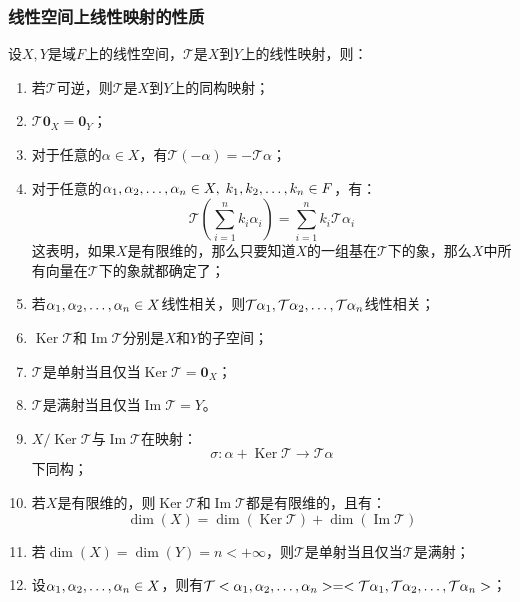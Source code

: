 \subsubsection{线性空间上线性映射的性质}
\begin{property}\label{prop:LinearMapping}
	设$X,Y$是域$F$上的线性空间，$\mathcal{T}$是$X$到$Y$上的线性映射，则：
	\begin{enumerate}
		\item 若$\mathcal{T}$可逆，则$\mathcal{T}$是$X$到$Y$上的同构映射；
		\item $\mathcal{T}\mathbf{0}_X=\mathbf{0}_Y$；
		\item 对于任意的$\alpha\in X$，有$\mathcal{T}(-\alpha)=-\mathcal{T}\alpha$；
		\item 对于任意的$\alpha_1, \alpha_2, \dots, \alpha_{n}\in X,\;k_1, k_2, \dots, k_{n}\in F$，有：
		\begin{equation*}
			\mathcal{T}\left(\sum_{i=1}^{n}k_i\alpha_i\right)=\sum_{i=1}^{n}k_i\mathcal{T}\alpha_i
		\end{equation*}
		这表明，如果$X$是有限维的，那么只要知道$X$的一组基在$\mathcal{T}$下的象，那么$X$中所有向量在$\mathcal{T}$下的象就都确定了；
		\item 若$\alpha_1, \alpha_2, \dots, \alpha_{n}\in X$线性相关，则$\mathcal{T}\alpha_1, \mathcal{T}\alpha_2, \dots, \mathcal{T}\alpha_{n}$线性相关；
		\item $\operatorname{Ker}\mathcal{T}$和$\operatorname{Im}\mathcal{T}$分别是$X$和$Y$的子空间；
		\item $\mathcal{T}$是单射当且仅当$\operatorname{Ker}\mathcal{T}=\mathbf{0}_X$；
		\item $\mathcal{T}$是满射当且仅当$\operatorname{Im}\mathcal{T}=Y$。
		\item $X/\operatorname{Ker}\mathcal{T}$与$\operatorname{Im}\mathcal{T}$在映射：
		\begin{equation*}
			\sigma:\alpha+\operatorname{Ker}\mathcal{T}\longrightarrow\mathcal{T}\alpha
		\end{equation*}
		下同构；
		\item 若$X$是有限维的，则$\operatorname{Ker}\mathcal{T}$和$\operatorname{Im}\mathcal{T}$都是有限维的，且有：
		\begin{equation*}
			\dim(X)=\dim(\operatorname{Ker}\mathcal{T})+\dim(\operatorname{Im}\mathcal{T})
		\end{equation*}
		\item 若$\dim(X)=\dim(Y)=n<+\infty$，则$\mathcal{T}$是单射当且仅当$\mathcal{T}$是满射；
		\item 设$\alpha_1, \alpha_2, \dots, \alpha_{n}\in X$，则有$\mathcal{T}<\alpha_1, \alpha_2, \dots, \alpha_{n}>=<\mathcal{T}\alpha_1, \mathcal{T}\alpha_2, \dots, \mathcal{T}\alpha_{n}>$；
	\end{enumerate}
\end{property}

